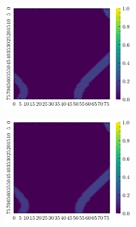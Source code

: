 \documentclass[../document.tex]{subfiles}
\begin{document}
\begin{figure}[H]
\begin{subfigure}[b]{1\textwidth}
\begin{subfigure}[b]{0.19\textwidth}
    \end{subfigure}
    \begin{subfigure}[b]{0.19\textwidth}
    \includegraphics[width=\linewidth]{../img/bars1-example-patches/2d/2.png}    
    \end{subfigure}  
    \begin{subfigure}[b]{0.19\textwidth}
    \includegraphics[width=\linewidth]{../img/bars1-example-patches/2d/4.png} 
    \end{subfigure}
    \begin{subfigure}[b]{0.19\textwidth}

\end{subfigure}
\end{subfigure}
\end{figure}
\end{document}
